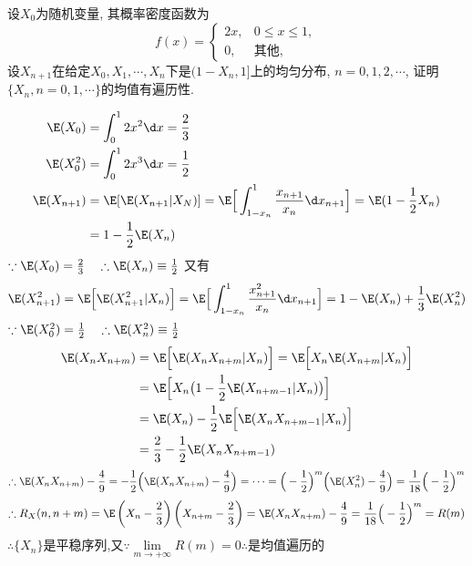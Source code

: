 \begin{problem}{4.16}
设$X_0$为随机变量, 其概率密度函数为
\[f(x) =
	\begin{cases}
		2x, & 0 \leqslant x \leqslant 1, \\
		0,  & \text{其他},
	\end{cases}
\]
设$X_{n+1}$在给定$X_0, X_1, \cdots, X_n$下是$(1-X_n,1]$上的均匀分布, $n=0,1,2,\cdots$, 证明$\{X_n, n=0,1,\cdots\}$的均值有遍历性.
\end{problem}
\begin{solution}
	\[\begin{split}
			\E(X_0) & = \int^1_0 2x^2\d x = \frac{2}{3}\\
			\E(X^2_0) & = \int^1_0 2x^3\d x = \frac{1}{2}\\
			\E(X_{n+1}) & = \E[\E(X_{n+1}|X_N)] = \E\Big[\int^1_{1-x_n}\frac{x_{n+1}}{x_n}\d x_{n+1}\Big] = \E(1-\frac{1}{2}X_n)\\
			& = 1-\frac{1}{2}\E(X_n)
		\end{split}
	\]
	$\because \E(X_0) = \frac{2}{3} \quad \therefore \E(X_n) \equiv \frac{1}{2}$
	又有
	\[\E(X^2_{n+1}) = \E\Big[\E(X^2_{n+1}|X_n)\Big] = \E\Big[\int^1_{1-x_n}\frac{x^2_{n+1}}{x_n}\d x_{n+1}\Big] = 1 - \E(X_n) + \frac{1}{3}\E(X^2_n)\]
	$\because \E(X^2_0) = \frac{1}{2} \quad \therefore \E(X^2_n) \equiv \frac{1}{2}$
	\[
		\begin{split}
			\E(X_n X_{n+m}) & = \E\Big[\E(X_n X_{n+m}|X_n)\Big] = \E\Big[X_n\E(X_{n+m}|X_n)\Big]\\
			& = \E\Big[X_n\big(1-\frac{1}{2}\E(X_{n+m-1}|X_n)\big)\Big]\\
			& = \E(X_n) - \frac{1}{2}\E\Big[\E(X_n X_{n+m-1}|X_n)\Big]\\
			& = \frac{2}{3} - \frac{1}{2}\E(X_n X_{n+m-1})
		\end{split}
	\]
	\[\therefore \E(X_n X_{n+m}) - \frac{4}{9} = -\frac{1}{2}\Big(\E(X_n X_{n+m}) - \frac{4}{9}\Big) = \cdots = \Big(-\frac{1}{2}\Big)^m\Big(\E(X^2_n) - \frac{4}{9}\Big) = \frac{1}{18}\Big(-\frac{1}{2}\Big)^m\]
	\[\therefore R_X(n,n+m) = \E\left(X_n - \frac{2}{3}\right)\left(X_{n+m} - \frac{2}{3}\right) = \E(X_n X_{n+m}) - \frac{4}{9}= \frac{1}{18}\Big(-\frac{1}{2}\Big)^m = R(m)\]
	$\therefore \{X_n\}$是平稳序列,又$\because \lim\limits_{m\to +\infty} R(m) = 0 \therefore$是均值遍历的
\end{solution}

